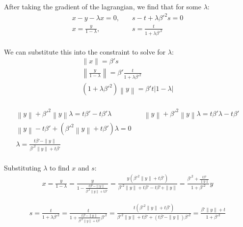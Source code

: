 \documentclass{article}
\theoremstyle{case}
\numberwithin{theorem}{subsection}
\begin{document}
After taking the gradient of the lagrangian, we find that for some $\lambda$:
\begin{align*}
x - y - \lambda x = 0, & \quad s - t + \lambda {\beta'}^2 s = 0 \\
x = \frac {y}{1 - \lambda}, & \quad s = \frac {t}{1 + \lambda {\beta'}^2 } \\
\end{align*}

We can substitute this into the constraint to solve for $\lambda$:
\begin{align*}
\|x\| = {\beta'} s \\
\left\|\frac {y}{1 - \lambda}\right\| = {\beta'} \frac {t}{1 + \lambda {\beta'}^2 } \\
\left(1 + \lambda {\beta'}^2\right) \left\|y\right\| = {\beta'}  {t} \left|1 - \lambda\right|\\
\end{align*}

\begin{align*}
\left\|y\right\| + {\beta'}^2\left\|y\right\|\lambda = t {\beta'} - t {\beta'} \lambda          &   \quad
\left\|y\right\| + {\beta'}^2\left\|y\right\|\lambda = t {\beta'} \lambda - t {\beta'}					\\
\left\|y\right\|-t {\beta'} +\left( {\beta'}^2\left\|y\right\| + t {\beta'} \right)\lambda = 0  &		\\
\lambda = \frac{t {\beta'} - \|y\|}{{\beta'}^2\|y\| + t {\beta'}}                               &		\\
\end{align*}


Substituting $\lambda$ to find $x$ and $s$:
\begin{align*}
x = \frac {y}{1 - \lambda} 																		
= \frac {y}{1 - \frac{t{\beta'} - \|y\|}{{\beta'}^2\|y\| + t{\beta'}}} 									
= \frac {y\left({\beta'}^2\|y\| + t{\beta'}\right)}{{\beta'}^2\|y\| + t{\beta'} - t{\beta'} + \|y\|} 			
= \frac {{\beta'}^2 + \frac{t{\beta'}}{\|y\|}}{1 + {\beta'}^2}y 											
\end{align*}

\begin{align*}
s = \frac {t}{1 + \lambda{\beta'}^2 } 
= \frac {t}{1 +\frac{t{\beta'} - \|y\|}{{\beta'}^2\|y\| + t{\beta'}}{\beta'}^2 } 
= \frac {t\left({\beta'}^2\|y\| + t{\beta'}\right)}{{\beta'}^2\|y\| + t{\beta'} + \left(t{\beta'} - \|y\|\right){\beta'}^2 } 
= \frac {{\beta'}\|y\| + t}{1 + {\beta'}^2 } 
\end{align*}
\end{document}
